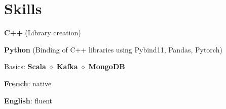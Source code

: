 \documentclass[]{deedy-resume-openfont}
\begin{document}
\sectionsep


	\section{Skills}
	\sectionsep

	\sectionsep
	\vspace{0.1cm}
	\begin{tightemize}
		\item[\diamond] \textbf{C++} (Library creation)
		\item[\diamond] \textbf{Python} (Binding of C++ libraries using Pybind11, Pandas, Pytorch)
		\item[\diamond] Basics: \textbf{Scala} $\diamond$ \textbf{Kafka} $\diamond$ \textbf{MongoDB}
	\end{tightemize}


	\sectionsep
	\sectionsep

	\sectionsep
	\vspace{0.1cm}
	\begin{tightemize}
		\item[\diamond] \textbf{French}: native
		\item[\diamond] \textbf{English}: fluent
	\end{tightemize}

	\vspace{-1.cm}
	\renewcommand\refname{\vskip -1.5em} %
	
	
	\nocite{*}



%
%
%
%
%
% 	
% 	
%
\end{document}
